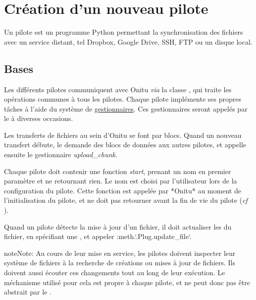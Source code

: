 \documentclass[letterpaper,10pt,english]{sphinxmanual}
\begin{document}
\section{Création d'un nouveau pilote}
\label{drivers:creating-a-new-driver}\label{drivers::doc}
Un pilote est un programme Python permettant la synchronisation des fichiers avec un service distant, tel Dropbox, Google Drive, SSH, FTP ou un disque local.


\subsection{Bases}
\label{drivers:basics}
Les différents pilotes communiquent avec Onitu \emph{via} la classe {\hyperref[drivers:onitu.api.Plug]{}}, qui traite les opérations communes à tous les pilotes. Chaque pilote implémente ses propres tâches à l'aide du système de {\hyperref[drivers:handlers]{gestionnaires}}. Ces gestionnaires seront appelés par le {\hyperref[drivers:onitu.api.Plug]{}} à diverses occasions.

Les transferts de fichiers au sein d'Onitu se font par blocs. Quand un nouveau transfert débute, le {\hyperref[drivers:onitu.api.Plug]{}} demande des blocs de données aux autres pilotes, et appelle ensuite le gestionnaire \emph{upload\_chunk}.

Chaque pilote doit contenir une fonction \emph{start}, prenant un nom en premier paramètre et ne retournant rien. Le nom est choisi par l'utilisateur lors de la configuration du pilote. Cette fonction est appelée par *Onitu* au moment de l'initialisation du pilote, et ne doit pas retourner avant la fin de vie du pilote (\emph{cf} {\hyperref[drivers:onitu.api.Plug.listen]{}}).

Quand un pilote détecte la mise à jour d'un fichier, il doit actualiser les {\hyperref[drivers:onitu.api.metadata.Metadata]{}} du fichier, en spécifiant une {\hyperref[drivers:onitu.api.metadata.Metadata.revision]{}}, et appeler :meth.{}`.Plug.update\_file{}`.

\begin{notice}{note}{Note:}
Au cours de leur mise en service, les pilotes doivent inspecter leur système de fichiers à la recherche de créations ou mises à jour de fichiers. Ils doivent aussi écouter ces changements tout au long de leur exécution. Le méchanisme utilisé pour cela est propre à chaque pilote, et ne peut donc pas être abstrait par le {\hyperref[drivers:onitu.api.Plug]{}}.
\end{notice}
\end{document}

